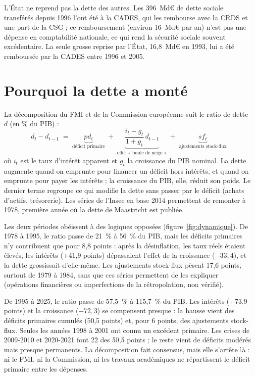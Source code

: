 \documentclass[11pt,a4paper]{article}
\begin{document}
L'État ne reprend pas la dette des autres. Les 396~Md€ de dette sociale transférés depuis 1996
l'ont été à la CADES, qui les rembourse avec la CRDS et une part de la CSG ; ce remboursement
(environ 16~Md€ par an) n'est pas une dépense en comptabilité nationale, ce qui rend la sécurité
sociale souvent excédentaire. La seule grosse reprise par l'État, 16,8~Md€ en 1993, lui a été
remboursée par la CADES entre 1996 et 2005.

\section{Pourquoi la dette a monté}\label{sec:dynamique}

La décomposition du FMI et de la Commission européenne suit le ratio de dette $d$ (en \% du PIB) :
\[ d_t-d_{t-1} \;=\; \underbrace{pd_t}_{\text{déficit primaire}} \;+\;
\underbrace{\frac{i_t-g_t}{1+g_t}\,d_{t-1}}_{\text{effet « boule de neige »}} \;+\;
\underbrace{sf_t}_{\text{ajustements stock-flux}} \]
où $i_t$ est le taux d'intérêt apparent et $g_t$ la croissance du PIB nominal. La dette augmente
quand on emprunte pour financer un déficit hors intérêts, et quand on emprunte pour payer les
intérêts ; la croissance du PIB, elle, réduit son poids. Le dernier terme regroupe ce qui modifie
la dette sans passer par le déficit (achats d'actifs, trésorerie). Les séries de l'Insee en base
2014 permettent de remonter à 1978, première année où la dette de Maastricht est publiée.


Les deux périodes obéissent à des logiques opposées (figure~\ref{fig:dynamique}). De 1978 à 1995,
le ratio passe de 21~\% à 56~\% du PIB, mais les déficits primaires n'y contribuent que pour 8,8
points : après la désinflation, les taux réels étaient élevés, les intérêts (+41,9 points)
dépassaient l'effet de la croissance ($-33{,}4$), et la dette grossissait d'elle-même. Les
ajustements stock-flux pèsent 17,6 points, surtout de 1979 à 1984, sans que ces séries permettent de
les expliquer (opérations financières ou imperfections de la rétropolation, non vérifié).

De 1995 à 2025, le ratio passe de 57,5~\% à 115,7~\% du PIB. Les intérêts (+73,9 points) et la
croissance ($-72{,}3$) se compensent presque : la hausse vient des déficits primaires cumulés (50,5
points) et, pour 6 points, des ajustements stock-flux. Seules les années 1998 à 2001 ont connu un
excédent primaire. Les crises de 2009-2010 et 2020-2021 font 22 des 50,5 points ; le reste vient de
déficits modérés mais presque permanents. La décomposition fait consensus, mais elle s'arrête là : ni le FMI, ni la
Commission, ni les travaux académiques ne répartissent le déficit primaire entre les dépenses.
\end{document}
